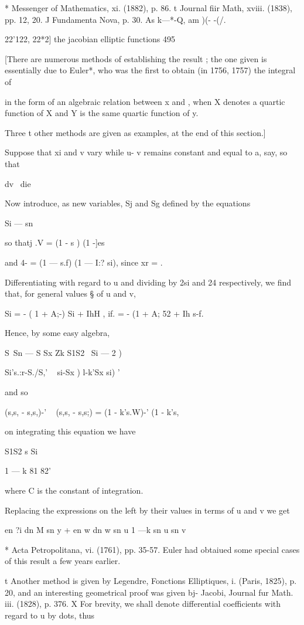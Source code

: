 * Messenger of Mathematics, xi. (1882), p. 86. t Journal fiir Math,
xviii. (1838), pp. 12, 20. J Fundamenta Nova, p. 30. As k—*-Q, am )(-
-(/.



22'122, 22*2] the jacobian elliptic functions 495

[There are numerous methods of establishing the result ; the one given
is essentially due to Euler*, who was the first to obtain (in 1756,
1757) the integral of

in the form of an algebraic relation between x and , when X denotes a
quartic function of X and Y is the same quartic function of y.

Three t other methods are given as examples, at the end of this
section.]

Suppose that xi and v vary while u- v remains constant and equal to a,
say, so that

dv \ die

Now introduce, as new variables, Sj and Sg defined by the equations

Si — sn %

so thatj .V = (1 - s ) (1 -]es \

and 4- = (1 — s.f) (1 — I:? si), since xr = .

Differentiating with regard to u and dividing by 2si and 24
respectively, we find that, for general values § of u and v,

Si = - ( 1 + A;-) Si + IhH , if. = - (1 + A; 52 + Ih s-f.

Hence, by some easy algebra,

S\ Sn — S Sx Zk S1S2 \ Si — 2 )

Si's.:r-S./S,' ~ si-Sx ) l-k'Sx si) '

and so

(s,s, - s,s,)-' ~ (s,s, - s,s;) = (1 - k's.W)-' (1 - k's,%

on integrating this equation we have

S1S2 s Si

1 — k 81 82'

where C is the constant of integration.

Replacing the expressions on the left by their values in terms of u
and v we get \

en ?i dn M sn y + en w dn w sn u 1 —k sn u sn v

* Acta Petropolitana, vi. (1761), pp. 35-57. Euler had obtaiued some
special cases of this result a few years earlier.

t Another method is given by Legendre, Fonctions Elliptiques, i.
(Paris, 1825), p. 20, and an interesting geometrical proof was given
bj- Jacobi, Journal fur Math. iii. (1828), p. 376. X For brevity, we
shall denote differential coefficients with regard to u by dots, thus


